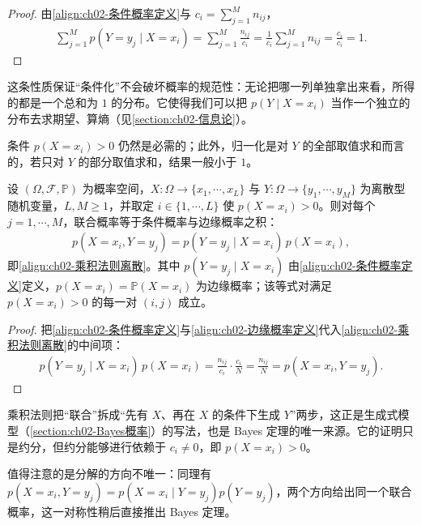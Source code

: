 \documentclass[../../main.tex]{subfiles}
\begin{document}
\begin{proof}
由\eqref{align:ch02-条件概率定义}与 $c_i=\sum_{j=1}^{M}n_{ij}$，
\begin{align*}
 \sum_{j=1}^{M} p(Y=y_j\mid X=x_i) = \sum_{j=1}^{M}\frac{n_{ij}}{c_i} = \frac{1}{c_i}\sum_{j=1}^{M}n_{ij} = \frac{c_i}{c_i} = 1 .
\end{align*}
\end{proof}

\begin{remark}
这条性质保证“条件化”不会破坏概率的规范性：无论把哪一列单独拿出来看，所得的都是一个总和为 $1$ 的分布。它使得我们可以把 $p(Y\mid X=x_i)$ 当作一个独立的分布去求期望、算熵（见\cref{section:ch02-信息论}）。

条件 $p(X=x_i)>0$ 仍然是必需的；此外，归一化是对 $Y$ 的全部取值求和而言的，若只对 $Y$ 的部分取值求和，结果一般小于 $1$。
\end{remark}

\begin{proposition}\label{proposition:ch02-乘积法则离散}
设 $(\Omega,\mathcal{F},\mathbb{P})$ 为概率空间，$X:\Omega\to\{x_1,\cdots,x_L\}$ 与 $Y:\Omega\to\{y_1,\cdots,y_M\}$ 为离散型随机变量，$L,M\geqslant1$，并取定 $i\in\{1,\cdots,L\}$ 使 $p(X=x_i)>0$。则对每个 $j=1,\cdots,M$，联合概率等于条件概率与边缘概率之积：
\begin{align*}
  p(X=x_i,Y=y_j)=p(Y=y_j\mid X=x_i)\,p(X=x_i),
\end{align*}
即\eqref{align:ch02-乘积法则离散}。其中 $p(Y=y_j\mid X=x_i)$ 由\eqref{align:ch02-条件概率定义}定义，$p(X=x_i)=\mathbb{P}(X=x_i)$ 为边缘概率；该等式对满足 $p(X=x_i)>0$ 的每一对 $(i,j)$ 成立。
\end{proposition}

\begin{proof}
把\eqref{align:ch02-条件概率定义}与\eqref{align:ch02-边缘概率定义}代入\eqref{align:ch02-乘积法则离散}的中间项：
\begin{align*}
 p(Y=y_j\mid X=x_i)\,p(X=x_i) = \frac{n_{ij}}{c_i}\cdot\frac{c_i}{N} = \frac{n_{ij}}{N} = p(X=x_i,Y=y_j) .
\end{align*}
\end{proof}

\begin{remark}
乘积法则把“联合”拆成“先有 $X$、再在 $X$ 的条件下生成 $Y$”两步，这正是生成式模型（\cref{section:ch02-Bayes概率}）的写法，也是 Bayes 定理的唯一来源。它的证明只是约分，但约分能够进行依赖于 $c_i\neq0$，即 $p(X=x_i)>0$。

值得注意的是分解的方向不唯一：同理有 $p(X=x_i,Y=y_j)=p(X=x_i\mid Y=y_j)p(Y=y_j)$，两个方向给出同一个联合概率，这一对称性稍后直接推出 Bayes 定理。
\end{remark}
\end{document}
